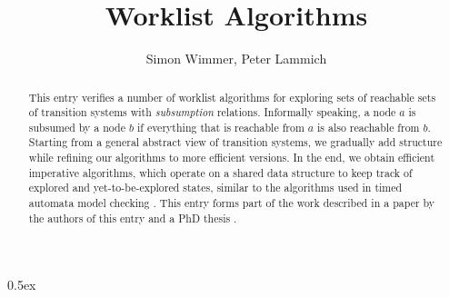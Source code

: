 \documentclass[11pt,a4paper]{article}
\begin{document}
\title{Worklist Algorithms}
\author{Simon Wimmer, Peter Lammich}

\maketitle
\begin{abstract}
  This entry verifies a number of worklist algorithms for exploring sets of reachable sets of
  transition systems with \emph{subsumption} relations.
  Informally speaking, a node $a$ is subsumed by a node $b$ if everything that is reachable from
  $a$ is also reachable from $b$.
  Starting from a general abstract view of transition systems,
  we gradually add structure while refining our algorithms to more efficient versions.
  In the end, we obtain efficient imperative algorithms,
  which operate on a shared data structure to keep track of explored and yet-to-be-explored states,
  similar to the algorithms used in timed automata model checking
  \cite{DBLP:conf/ac/BengtssonY03,DBLP:conf/formats/BehrmannLR05}.
  This entry forms part of the work described in a paper by the authors of this entry
  \cite{DBLP:conf/tacas/WimmerL18} and a PhD thesis \cite{DBLP:phd/dnb/Wimmer20}.
\end{abstract}

\tableofcontents
\newpage

\parindent 0pt\parskip 0.5ex





\end{document}
